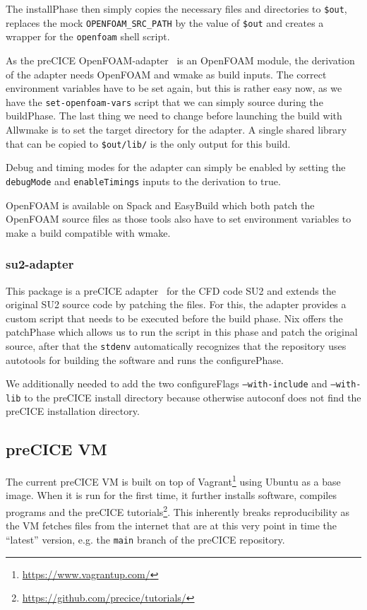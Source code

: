 \documentclass{eceasst}
\begin{document}
The installPhase then simply copies the necessary files and directories to \texttt{\$out}, replaces the mock \texttt{OPENFOAM\_SRC\_PATH} by the value of \texttt{\$out} and creates a wrapper for the \texttt{openfoam} shell script.

As the preCICE OpenFOAM-adapter~\cite{OpenFOAMpreCICE} is an OpenFOAM module, the derivation of the adapter needs OpenFOAM and wmake as build inputs.
The correct environment variables have to be set again, but this is rather easy now, as we have the \texttt{set-openfoam-vars} script that we can simply source during the buildPhase.
The last thing we need to change before launching the build with Allwmake is to set the target directory for the adapter.
A single shared library that can be copied to \texttt{\$out/lib/} is the only output for this build.

Debug and timing modes for the adapter can simply be enabled by setting the \texttt{debugMode} and \texttt{enableTimings} inputs to the derivation to true.

OpenFOAM is available on Spack and EasyBuild which both patch the OpenFOAM source files as those tools also have to set environment variables to make a build compatible with wmake.\\

\subsubsection{su2-adapter}

This package is a preCICE adapter~\cite{Uekermann2017_Adapters} for the CFD code SU2 and extends the original SU2 source code by patching the files.
For this, the adapter provides a custom script that needs to be executed before the build phase.
Nix offers the patchPhase which allows us to run the script in this phase and patch the original source, after that the \texttt{stdenv} automatically recognizes that the repository uses autotools for building the software and runs the configurePhase.

We additionally needed to add the two configureFlags \texttt{--with-include} and \texttt{--with-lib} to the preCICE install directory because otherwise autoconf does not find the preCICE installation directory.

\subsection{preCICE VM}

The current preCICE VM is built on top of Vagrant\footnote{\url{https://www.vagrantup.com/}} using Ubuntu as a base image.
When it is run for the first time, it further installs software, compiles programs and the preCICE tutorials\footnote{\url{https://github.com/precice/tutorials/}}.
This inherently breaks reproducibility as the VM fetches files from the internet that are at this very point in time the ``latest'' version, e.g. the \texttt{main} branch of the preCICE repository.
\end{document}
